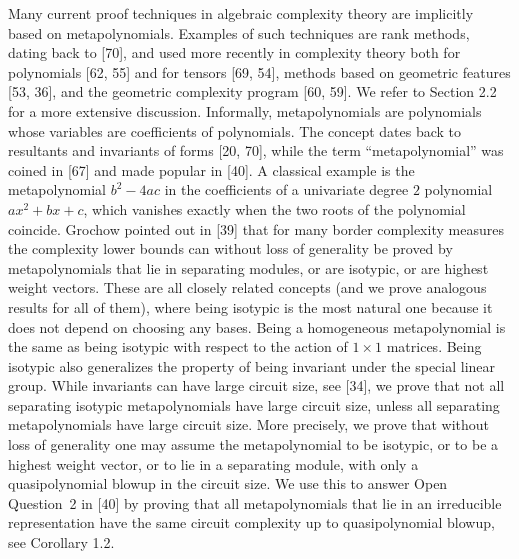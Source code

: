 \documentclass[10pt,a4paper]{article}
\begin{document}
Many current proof techniques in algebraic complexity theory are implicitly based on metapolynomials. Examples of such techniques are rank methods, dating back to [70], and used more recently in complexity theory both for polynomials [62, 55] and for tensors [69, 54], methods based on geometric features [53, 36], and the geometric complexity program [60, 59]. We refer to Section 2.2 for a more extensive discussion. Informally, metapolynomials are polynomials whose variables are coefficients of polynomials. The concept dates back to resultants and invariants of forms [20, 70], while the term “metapolynomial” was coined in [67] and made popular in [40]. A classical example is the metapolynomial $b^{2}-4ac$ in the coefficients of a univariate degree $2$ polynomial $ax^{2}+bx+c$, which vanishes exactly when the two roots of the polynomial coincide.
Grochow pointed out in [39] that for many border complexity measures the complexity lower bounds can without loss of generality be proved by metapolynomials that lie in separating modules, or are isotypic, or are highest weight vectors.
These are all closely related concepts (and we prove analogous results for all of them), where being isotypic is the most natural one because it does not depend on choosing any bases.
Being a homogeneous metapolynomial is the same as being isotypic with respect to the action of $1\times 1$ matrices.
Being isotypic also generalizes the property of being invariant under the special linear group.
While invariants can have large circuit size, see [34],
we prove that not all separating isotypic metapolynomials have large circuit size, unless all separating metapolynomials have large circuit size.
More precisely, we prove that without loss of generality one may assume the metapolynomial to be isotypic, or to be a highest weight vector, or to lie in a separating module, with only a quasipolynomial blowup in the circuit size.
We use this to answer Open Question 2 in [40] by proving that all metapolynomials that lie in an irreducible representation have the same circuit complexity up to quasipolynomial blowup, see Corollary 1.2.
\end{document}
